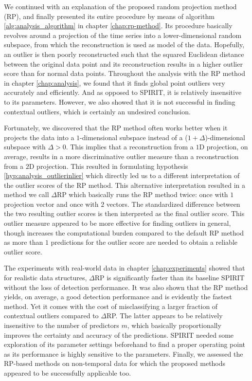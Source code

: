 We continued with an explanation of the proposed random projection method (RP), and finally presented its entire procedure by means of algorithm \ref{alg:analysis_algorithm} in chapter \ref{chap:rp-method}. Its procedure basically revolves around a projection of the time series into a lower-dimensional random subspace, from which the reconstruction is used as model of the data. Hopefully, an outlier is then poorly reconstructed such that the squared Euclidean distance between the original data point and its reconstruction results in a higher outlier score than for normal data points.
Throughout the analysis with the RP method in chapter \ref{chap:analysis}, we found that it finds global point outliers very accurately and efficiently. And as opposed to SPIRIT, it is relatively insensitive to its parameters. However, we also showed that it is not successful in finding contextual outliers, which is certainly an undesired conclusion.

Fortunately, we discovered that the RP method often works better when it projects the data into a $1$-dimensional subspace instead of a ($1+\Delta$)-dimensional subspace with $\Delta > 0$. This implies that a reconstruction from a $1$D projection, on average, results in a more discriminative outlier measure than a reconstruction from a $2$D projection. This resulted in formulating hypothesis \ref{hyp:analysis_outlierinlier} which directly led us to a different interpretation of the outlier scores of the RP method. This alternative interpretation resulted in a method we call $\Delta$RP which basically runs the RP method twice: once with $1$ projection vector and once with $2$ vectors. The standardized difference between the two resulting outlier scores is then interpreted as the final outlier score. This outlier measure appeared to be more effective for finding outliers in general, though increases the computational burden compared to the default RP method as more than $1$ predictions for the outlier score are needed to obtain a reliable outlier score.

The experiments with real-world data in chapter \ref{chap:experiments} showed that for realistic data structures, $\Delta$RP is significantly faster than its baseline SPIRIT without the loss of detection performance. It was also shown that the RP method yields, on average, a good detection performance and is evidently the fastest method. Yet it comes with the cost of misclassifying a larger fraction of contextual outliers compared to $\Delta$RP.
The latter appears to be relatively insensitive to the number of predictors $m$, which basically proportionally improves the certainty and accuracy of the predictions. SPIRIT needed some exploration of its parameter settings beforehand to find a proper operating point as its performance is highly sensitive to the parameters.
Finally, we assessed the RP-based methods on non-temporal data for which the proposed methods appeared to be successfully applicable too.


